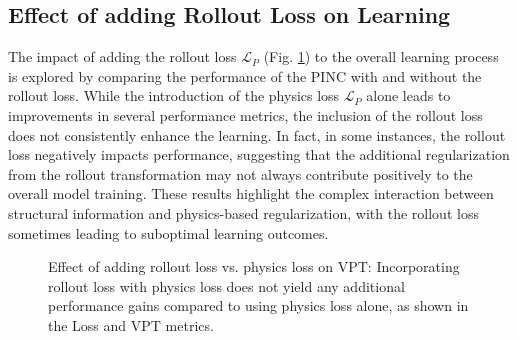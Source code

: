 \documentclass[conference]{IEEEtran}
\begin{document}
{\subsection{Effect of adding Rollout Loss on Learning}
The impact of adding the rollout loss $\mathcal{L}_P$ (Fig. \ref{fig:rollout}) to the overall learning process is explored by comparing the performance of the PINC with and without the rollout loss. While the introduction of the physics loss $\mathcal{L}_P$ alone leads to improvements in several performance metrics, the inclusion of the rollout loss does not consistently enhance the learning. In fact, in some instances, the rollout loss negatively impacts performance, suggesting that the additional regularization from the rollout transformation may not always contribute positively to the overall model training. These results highlight the complex interaction between structural information and physics-based regularization, with the rollout loss sometimes leading to suboptimal learning outcomes.

\begin{figure}[!t]

    \caption{Effect of adding rollout loss vs. physics loss on VPT: Incorporating rollout loss with physics loss does not yield any additional performance gains compared to using physics loss alone, as shown in the Loss and VPT metrics.}
    \label{fig:rollout}
\end{figure}


%

%

}
\end{document}
